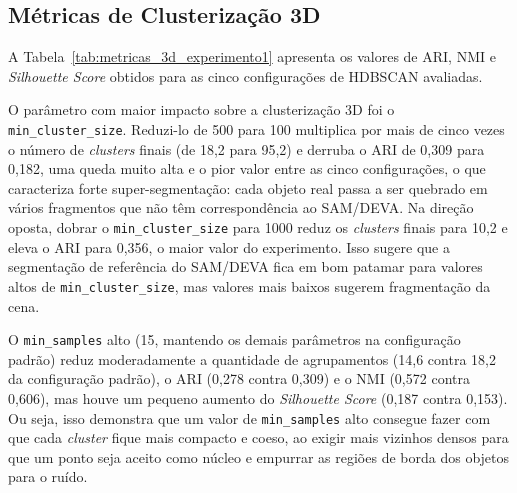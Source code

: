 \subsection{Métricas de Clusterização 3D}

A Tabela~\ref{tab:metricas_3d_experimento1} apresenta os valores de ARI, NMI e \textit{Silhouette Score} obtidos para as cinco configurações de HDBSCAN avaliadas.

\begin{table}[h]
\centering
\caption{Métricas de clusterização 3D para cada configuração de HDBSCAN (média de 5 execuções)}
\label{tab:metricas_3d_experimento1}
\end{table}

O parâmetro com maior impacto sobre a clusterização 3D foi o \texttt{min\_cluster\_size}. Reduzi-lo de 500 para 100 multiplica por mais de cinco vezes o número de \textit{clusters} finais (de 18,2 para 95,2) e derruba o ARI de 0,309 para 0,182, uma queda muito alta e o pior valor entre as cinco configurações, o que caracteriza forte super-segmentação: cada objeto real passa a ser quebrado em vários fragmentos que não têm correspondência ao SAM/DEVA. Na direção oposta, dobrar o \texttt{min\_cluster\_size} para 1000 reduz os \textit{clusters} finais para 10,2 e eleva o ARI para 0,356, o maior valor do experimento. Isso sugere que a segmentação de referência do SAM/DEVA fica em bom patamar para valores altos de \texttt{min\_cluster\_size}, mas valores mais baixos sugerem fragmentação da cena.

O \texttt{min\_samples} alto (15, mantendo os demais parâmetros na configuração padrão) reduz moderadamente a quantidade de agrupamentos (14,6 contra 18,2 da configuração padrão), o ARI (0,278 contra 0,309) e o NMI (0,572 contra 0,606), mas houve um pequeno aumento do \textit{Silhouette Score} (0,187 contra 0,153). Ou seja, isso demonstra que um valor de \texttt{min\_samples} alto consegue fazer com que cada \textit{cluster} fique mais compacto e coeso, ao exigir mais vizinhos densos para que um ponto seja aceito como núcleo e empurrar as regiões de borda dos objetos para o ruído.

